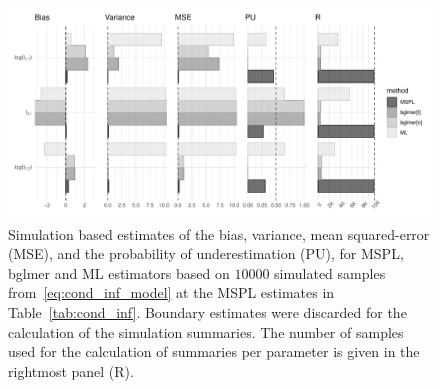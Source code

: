 \documentclass[11pt, a4paper]{article}
\theoremstyle{example} \newtheorem{example}{Example}[section]
\theoremstyle{theorem} \newtheorem{theorem}{Theorem}[section]
\begin{document}
\begin{figure}[ht]
  \begin{center}
    \includegraphics[width=\textwidth]{Figures/cond_inf_simul.pdf}
  \end{center}
  \caption{Simulation based estimates of the bias, variance, mean squared-error (MSE), and the probability of underestimation (PU), for MSPL, bglmer and ML estimators based on $10000$ simulated samples from~\eqref{eq:cond_inf_model} at the MSPL estimates in Table~\ref{tab:cond_inf}. Boundary estimates were discarded for the calculation of the simulation summaries. The number of samples used for the calculation of summaries per parameter is given in the rightmost panel (R).
  }\label{fig:cond_inf_simul}
\end{figure}
\end{document}
